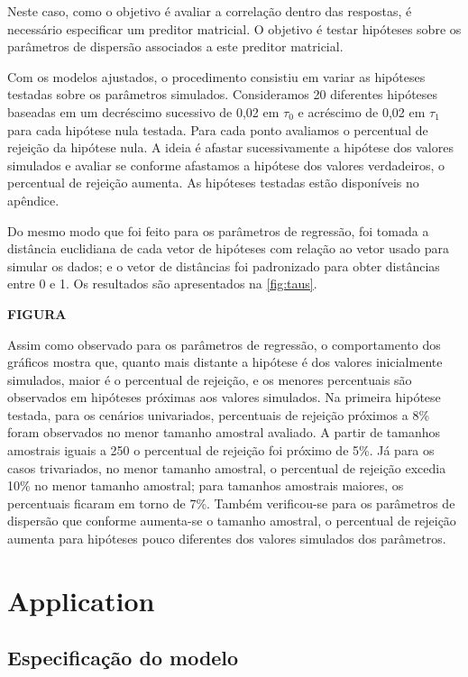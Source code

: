 \documentclass[AMA,STIX1COL]{WileyNJD-v2}
\begin{document}
Neste caso, como o objetivo é avaliar a correlação dentro das respostas, é necessário especificar um preditor matricial. O objetivo é testar hipóteses sobre os parâmetros de dispersão associados a este preditor matricial. 

Com os modelos ajustados, o procedimento consistiu em variar as hipóteses testadas sobre os parâmetros simulados. Consideramos 20 diferentes hipóteses baseadas em um decréscimo sucessivo de 0,02 em $\tau_0$ e acréscimo de 0,02 em $\tau_1$ para cada hipótese nula testada. Para cada ponto avaliamos o percentual de rejeição da hipótese nula. A ideia é afastar sucessivamente a hipótese dos valores simulados e avaliar se conforme afastamos a hipótese dos valores verdadeiros, o percentual de rejeição aumenta. As hipóteses testadas estão disponíveis no apêndice.

Do mesmo modo que foi feito para os parâmetros de regressão, foi tomada a distância euclidiana de cada vetor de hipóteses com relação ao vetor usado para simular os dados; e o vetor de distâncias foi padronizado para obter distâncias entre 0 e 1. Os resultados são apresentados na \autoref{fig:taus}.

\textbf{FIGURA}

Assim como observado para os parâmetros de regressão, o comportamento dos gráficos mostra que, quanto mais distante a hipótese é dos valores inicialmente simulados, maior é o percentual de rejeição, e os menores percentuais são observados em hipóteses próximas aos valores simulados. Na primeira hipótese testada, para os cenários univariados, percentuais de rejeição próximos a 8\% foram observados no menor tamanho amostral avaliado. A partir de tamanhos amostrais iguais a 250 o percentual de rejeição foi próximo de 5\%. Já para os casos trivariados, no menor tamanho amostral, o percentual de rejeição excedia 10\% no menor tamanho amostral; para tamanhos amostrais maiores, os percentuais ficaram em torno de 7\%. Também verificou-se para os parâmetros de dispersão que conforme aumenta-se o tamanho amostral, o percentual de rejeição aumenta para hipóteses pouco diferentes dos valores simulados dos parâmetros.


\section{Application}\label{sec6}

\subsection{Especificação do modelo}
\end{document}
